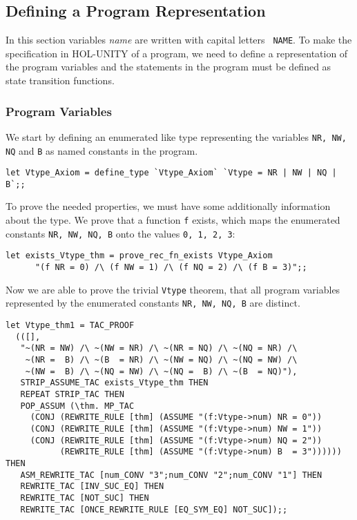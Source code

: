 \subsection{Defining a Program Representation}

In this section variables {\it name} are written with capital letters {\tt
NAME}.  To make the specification in HOL-UNITY of a program, we need to define
a representation of the program variables and the statements in the program
must be defined as state transition functions.

\subsubsection{Program Variables}

We start by defining an enumerated like type representing the variables
{\tt NR, NW, NQ} and {\tt B} as named constants in the program.

{\footnotesize 
\begin{verbatim}
let Vtype_Axiom = define_type `Vtype_Axiom` `Vtype = NR | NW | NQ | B`;;
\end{verbatim}
}

To prove the needed properties, we must have some additionally information
about the type.  We prove that a function {\tt f} exists, which maps the
enumerated constants {\tt NR, NW, NQ, B} onto the values {\tt 0, 1, 2, 3}:

{\footnotesize 
\begin{verbatim}
let exists_Vtype_thm = prove_rec_fn_exists Vtype_Axiom 
      "(f NR = 0) /\ (f NW = 1) /\ (f NQ = 2) /\ (f B = 3)";;
\end{verbatim}
}

Now we are able to prove the trivial {\tt Vtype} theorem, that all program
variables represented by the enumerated constants {\tt NR, NW, NQ, B} are 
distinct.

{\footnotesize 
\begin{verbatim}
let Vtype_thm1 = TAC_PROOF
  (([],
   "~(NR = NW) /\ ~(NW = NR) /\ ~(NR = NQ) /\ ~(NQ = NR) /\
    ~(NR =  B) /\ ~(B  = NR) /\ ~(NW = NQ) /\ ~(NQ = NW) /\
    ~(NW =  B) /\ ~(NQ = NW) /\ ~(NQ =  B) /\ ~(B  = NQ)"),
   STRIP_ASSUME_TAC exists_Vtype_thm THEN
   REPEAT STRIP_TAC THEN
   POP_ASSUM (\thm. MP_TAC
     (CONJ (REWRITE_RULE [thm] (ASSUME "(f:Vtype->num) NR = 0"))
     (CONJ (REWRITE_RULE [thm] (ASSUME "(f:Vtype->num) NW = 1"))
     (CONJ (REWRITE_RULE [thm] (ASSUME "(f:Vtype->num) NQ = 2"))
           (REWRITE_RULE [thm] (ASSUME "(f:Vtype->num) B  = 3")))))) THEN
   ASM_REWRITE_TAC [num_CONV "3";num_CONV "2";num_CONV "1"] THEN
   REWRITE_TAC [INV_SUC_EQ] THEN
   REWRITE_TAC [NOT_SUC] THEN
   REWRITE_TAC [ONCE_REWRITE_RULE [EQ_SYM_EQ] NOT_SUC]);;
\end{verbatim}
}

